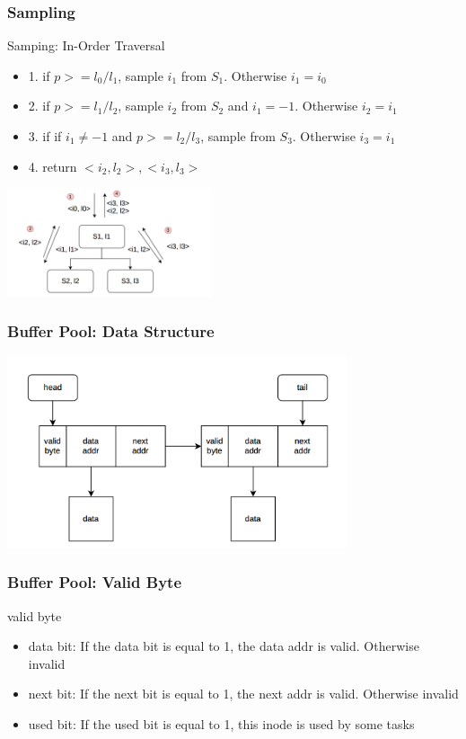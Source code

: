 \documentclass[notheorems, aspectratio=54]{beamer}
\begin{document}
\begin{frame}
    \frametitle{Sampling}
    \begin{block} {Samping: In-Order Traversal}
        \begin{itemize}
            \item 1. if $p >= l_0/l_1$, sample $i_1$ from $S_1$. Otherwise $i_1 = i_0$
            \item 2. if $p >= l_1/l_2$, sample $i_2$ from $S_2$ and $i_1 = -1$. Otherwise $i_2 = i_1$
            \item 3. if if $i_1 \neq -1$ and $p >= l_2/l_3$, sample from $S_3$. Otherwise $i_3 = i_1$
            \item 4. return $<i_2, l_2>, <i_3, l_3>$
        \end{itemize}
    \end{block}
    \centering
    \includegraphics[width=6cm]{global_img_dir/Sampling.png}
\end{frame}

\begin{frame}
    \frametitle{Buffer Pool: Data Structure}
    \centering
    \includegraphics[width=10cm]{global_img_dir/linklist.png}
\end{frame}

\begin{frame}
    \frametitle{Buffer Pool: Valid Byte}
    \begin{block} {valid byte}
        \begin{itemize}
            \item data bit: If the data bit is equal to 1, the data addr is valid. Otherwise invalid
            \item next bit: If the next bit is equal to 1, the next addr is valid. Otherwise invalid
            \item used bit: If the used bit is equal to 1, this inode is used by some tasks
        \end{itemize}
    \end{block}
\end{frame}
\end{document}
